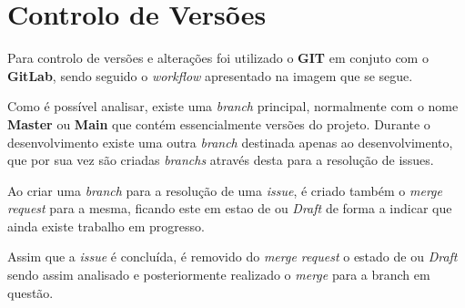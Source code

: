 \section{Controlo de Versões}

Para controlo de versões e alterações foi utilizado o \textbf{GIT} em conjuto com o \textbf{GitLab}, sendo seguido o \textit{workflow} apresentado na imagem que se segue.


Como é possível analisar, existe uma \textit{branch} principal, normalmente com o nome \textbf{Master} ou \textbf{Main} que contém essencialmente versões do projeto. Durante o desenvolvimento existe uma outra \textit{branch} destinada apenas ao desenvolvimento, que por sua vez são criadas \textit{branchs} através desta para a resolução de issues.

Ao criar uma \textit{branch} para a resolução de uma \textit{issue}, é criado também o \textit{merge request} para a mesma, ficando este em estao de \textit{} ou \textit{Draft} de forma a indicar que ainda existe trabalho em progresso.

Assim que a \textit{issue} é concluída, é removido do \textit{merge request} o estado de \textit{} ou \textit{Draft} sendo assim analisado e posteriormente realizado o \textit{merge} para a branch em questão.